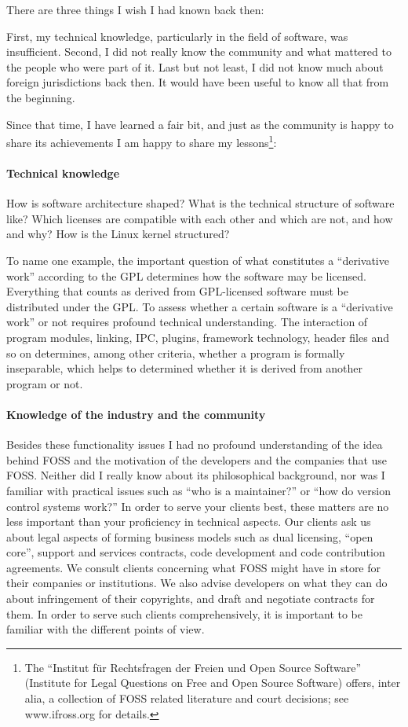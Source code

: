 There are three things I wish I had known back then:

First, my technical knowledge, particularly in the field of software, was
insufficient. Second, I did not really know the community and what mattered to
the people who were part of it. Last but not least, I did not know much about
foreign jurisdictions back then. It would have been useful to know all that from
the beginning.

Since that time, I have learned a fair bit, and just as the community is happy
to share its achievements I am happy to share my lessons\footnote{The ``Institut
f\"ur Rechtsfragen der Freien und Open Source Software'' (Institute for Legal
Questions on Free and Open Source Software) offers, inter alia, a collection of
FOSS related literature and court decisions; see www.ifross.org for details.}:

\paragraph*{Technical knowledge}
How is software architecture shaped? What is the technical structure of software
like? Which licenses are compatible with each other and which are not, and how
and why? How is the Linux kernel structured? 

To name one example, the important question of what constitutes a ``derivative
work'' according to the GPL determines how the software may be licensed.
Everything that counts as derived from GPL-licensed software must be distributed
under the GPL. To assess whether a certain software is a ``derivative work'' or
not requires profound technical understanding. The interaction of program
modules, linking, IPC, plugins, framework technology, header files and so on
determines, among other criteria, whether a program is formally inseparable,
which helps to determined whether it is derived from another program or not. 

\paragraph*{Knowledge of the industry and the community}
Besides these functionality issues I had no profound understanding of the idea
behind FOSS and the motivation of the developers and the companies that use
FOSS. Neither did I really know about its philosophical background, nor was I
familiar with practical issues such as ``who is a maintainer?'' or ``how do version control systems work?'' In order to serve your clients best, these matters are no less important than your proficiency in technical aspects.  
Our clients ask us about legal aspects of forming business models such as dual
licensing, ``open core'', support and services contracts, code development and
code contribution agreements. We consult clients concerning what FOSS might have
in store for their companies or institutions. We also advise developers on what
they can do about infringement of their copyrights, and draft and negotiate
contracts for them. In order to serve such clients comprehensively, it is
important to be familiar with the different points of view.  

